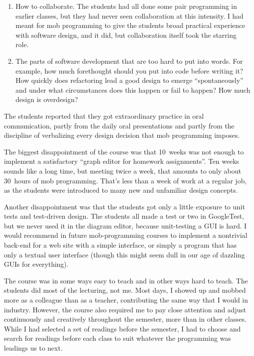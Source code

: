 \documentclass{article}
\begin{document}
\begin{enumerate}
\item How to collaborate. The students had all done some pair programming in
earlier classes, but they had never seen collaboration at this intensity. I
had meant for mob programming to give the students broad practical experience
with software design, and it did, but collaboration itself took the
starring role.

\item The parts of software development that are too hard to put into words.
For example, how much forethought should you put into code before writing
it? How quickly does refactoring lead a good design to emerge
``spontaneously'' and under what circumstances does this happen or fail to
happen? How much design is overdesign?
\end{enumerate}

The students reported that they got extraordinary practice in oral
communication, partly from the daily oral presentations and partly from the
discipline of verbalizing every design decision that mob programming imposes.

The biggest disappointment of the course was that 10~weeks was not enough to
implement a satisfactory ``graph editor for homework assignments''. Ten weeks
sounds like a long time, but meeting twice a week, that amounts to only
about 30~hours of mob programming.  That's less than a week of work at a
regular job, as the students were introduced to many new and unfamiliar design
concepts.

Another disappointment was that the students got only a little exposure to
unit tests and test-driven design. The students all made a test or two in
GoogleTest, but we never used it in the diagram editor, because unit-testing
a GUI is hard. I would recommend in future mob-programming courses to
implement a nontrivial back-end for a web site with a simple interface, or
simply a program that has only a textual user interface (though this might
seem dull in our age of dazzling GUIs for everything).

The course was in some ways easy to teach and in other ways hard to teach.
The students did most of the lecturing, not me. Most days, I showed up and
mobbed more as a colleague than as a teacher, contributing the same way that I
would in industry. However, the course also required me to pay close attention
and adjust continuously and creatively throughout the semester, more than in
other classes. While I had selected a set of readings before the semester, I
had to choose and search for readings before each class to suit whatever the
programming was leadings us to next.
\end{document}
